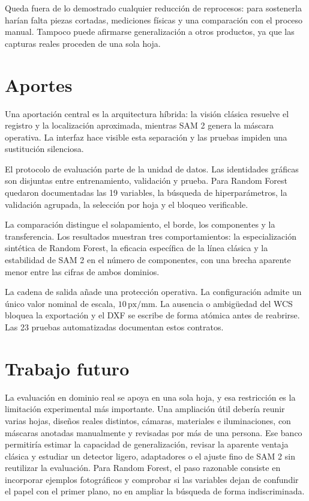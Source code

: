 Queda fuera de lo demostrado cualquier reducción de reprocesos: para sostenerla harían falta piezas cortadas, mediciones físicas y una comparación con el proceso manual. Tampoco puede afirmarse generalización a otros productos, ya que las capturas reales proceden de una sola hoja.

\section{Aportes}

Una aportación central es la arquitectura híbrida: la visión clásica resuelve el registro y la localización aproximada, mientras SAM 2 genera la máscara operativa. La interfaz hace visible esta separación y las pruebas impiden una sustitución silenciosa.

El protocolo de evaluación parte de la unidad de datos. Las identidades gráficas son disjuntas entre entrenamiento, validación y prueba. Para Random Forest quedaron documentadas las 19 variables, la búsqueda de hiperparámetros, la validación agrupada, la selección por hoja y el bloqueo verificable.

La comparación distingue el solapamiento, el borde, los componentes y la transferencia. Los resultados muestran tres comportamientos: la especialización sintética de Random Forest, la eficacia específica de la línea clásica y la estabilidad de SAM 2 en el número de componentes, con una brecha aparente menor entre las cifras de ambos dominios.

La cadena de salida añade una protección operativa. La configuración admite un único valor nominal de escala, $10\,\text{px/mm}$. La ausencia o ambigüedad del WCS bloquea la exportación y el DXF se escribe de forma atómica antes de reabrirse. Las 23 pruebas automatizadas documentan estos contratos.

\section{Trabajo futuro}

La evaluación en dominio real se apoya en una sola hoja, y esa restricción es la limitación experimental más importante. Una ampliación útil debería reunir varias hojas, diseños reales distintos, cámaras, materiales e iluminaciones, con máscaras anotadas manualmente y revisadas por más de una persona. Ese banco permitiría estimar la capacidad de generalización, revisar la aparente ventaja clásica y estudiar un detector ligero, adaptadores o el ajuste fino de SAM 2 sin reutilizar la evaluación. Para Random Forest, el paso razonable consiste en incorporar ejemplos fotográficos y comprobar si las variables dejan de confundir el papel con el primer plano, no en ampliar la búsqueda de forma indiscriminada.


